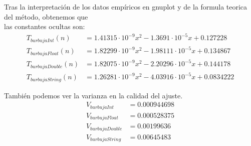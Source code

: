 \documentclass[11pt,openany]{book}
\begin{document}
Tras la interpretación de los datos empíricos en gnuplot y de la formula teorica del método, obtenemos que \\
las constantes ocultas son:
\begin{align*}
    T_{burbujaInt}(n)    & =1.41315 \cdot 10^{-9}x^{2}-1.3691 \cdot 10^{-5}x+0.127228   \\
    T_{burbujaFloat}(n)  & =1.82299 \cdot 10^{-9}x^{2}-1.98111 \cdot 10^{-5}x+0.134867  \\
    T_{burbujaDouble}(n) & =1.82075 \cdot 10^{-9}x^{2}-2.20296 \cdot 10^{-5}x+0.144178  \\
    T_{burbujaString}(n) & =1.26281 \cdot 10^{-9}x^{2}-4.03916 \cdot 10^{-5}x+0.0834222
\end{align*}


También podemos ver la varianza en la calidad del ajuste.
\begin{align*}
    V_{burbujaInt}    & =0.000944698 \\
    V_{burbujaFloat}  & =0.000528375 \\
    V_{burbujaDouble} & =0.00199636  \\
    V_{burbujaString} & =0.00645483
\end{align*}
\end{document}
